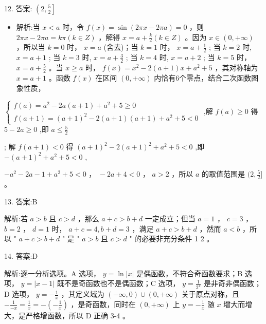 \documentclass[10pt]{article}
\begin{document}
12. 答案: \(\left( {2,\frac{5}{2}}\right\rbrack\)

\begin{itemize}\relax
\item\relax 解析:当 \(x < a\) 时，令 \(f\left( x\right)  = \sin \left( {{2\pi x} - {2\pi a}}\right)  = 0\) ，则 \({2\pi x} - {2\pi a} = {k\pi }\left( {k \in  Z}\right)\) ，解得 \(x = a + \frac{k}{2}\left( {k \in  Z}\right)\) 。因为 \(x \in  \left( {0, + \infty }\right)\) ，所以当 \(k = 0\) 时， \(x = a\) (舍去)；当 \(k = 1\) 时， \(x = a + \frac{1}{2}\) ; 当 \(k = 2\) 时, \(x = a + 1\) ; 当 \(k = 3\) 时, \(x = a + \frac{3}{2}\) ; 当 \(k = 4\) 时, \(x = a + 2\) ; 当 \(k = 5\) 时， \(x = a + \frac{5}{2}\) 。当 \(x \geq  a\) 时， \(f\left( x\right)  = {x}^{2} - 2\left( {a + 1}\right) x + {a}^{2} + 5\) ，其对称轴为 \(x = a + 1\) 。函数 \(f\left( x\right)\) 在区间 \(\left( {0, + \infty }\right)\) 内恰有6个零点，结合二次函数图象性质，
\end{itemize}

\(\left\{  \begin{array}{l} f\left( a\right)  = {a}^{2} - {2a}\left( {a + 1}\right)  + {a}^{2} + 5 \geq  0 \\  f\left( {a + 1}\right)  = {\left( a + 1\right) }^{2} - 2\left( {a + 1}\right) \left( {a + 1}\right)  + {a}^{2} + 5 < 0 \end{array}\right.\) ,解 \(f\left( a\right)  \geq  0\) 得 \(5 - {2a} \geq  0\) ,即 \(a \leq  \frac{5}{2}\)

; 解 \(f\left( {a + 1}\right)  < 0\) 得 \({\left( a + 1\right) }^{2} - 2{\left( a + 1\right) }^{2} + {a}^{2} + 5 < 0\) ,即 \(- {\left( a + 1\right) }^{2} + {a}^{2} + 5 < 0\) ,

\(- {a}^{2} - {2a} - 1 + {a}^{2} + 5 < 0\text{ ， } - {2a} + 4 < 0\text{ ， }a > 2\) ，所以 \(a\) 的取值范围是 \((2,\frac{5}{2}\rbrack\) 。

13. 答案:B

解析:若 \(a > b\) 且 \(c > d\) ，那么 \(a + c > b + d\) 一定成立；但当 \(a = 1\) ， \(c = 3\) ， \(b = 2\) ， \(d = 1\) 时， \(a + c = 4,b + d = 3\) ，满足 \(a + c > b + d\) ，然而 \(a < b\) ，所以 " \(a + c > b + d\) " 是 " \(a > b\) 且 \(c > d\) " 的必要非充分条件 1 2 。

14. 答案:D

解析:逐一分析选项。A 选项， \(y = \ln \left| x\right|\) 是偶函数，不符合奇函数要求；B 选项， \(y = \left| {x - 1}\right|\) 既不是奇函数也不是偶函数；C 选项， \(y = \frac{1}{{2}^{x}}\) 是非奇非偶函数；D 选项， \(y =  - \frac{1}{x}\) ，其定义域为 \(\left( {-\infty ,0}\right)  \cup  \left( {0, + \infty }\right)\) 关于原点对称，且 \(- \frac{1}{-x} = \frac{1}{x} =  - \left( {-\frac{1}{x}}\right)\) ，是奇函数，同时在 \(\left( {0, + \infty }\right)\) 上 \(y =  - \frac{1}{x}\) 随 \(x\) 增大而增大，是严格增函数，所以 D 正确 3-4 。
\end{document}
